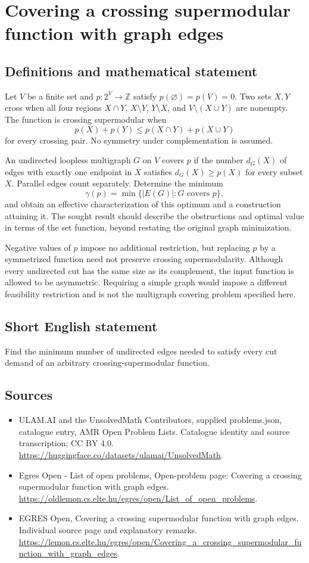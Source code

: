 \documentclass[11pt,a4paper]{article}
\begin{document}
\section*{Covering a crossing supermodular function with graph edges}\label{statement}

\subsection{Definitions and mathematical statement}
Let $V$ be a finite set and $p:2^V\to\mathbb Z$ satisfy
$p(\varnothing)=p(V)=0$. Two sets $X,Y$ cross when all four regions
$X\cap Y$, $X\setminus Y$, $Y\setminus X$, and $V\setminus(X\cup Y)$
are nonempty. The function is crossing supermodular when
\[
                     p(X)+p(Y)\le p(X\cap Y)+p(X\cup Y)
\]
for every crossing pair. No symmetry under complementation is assumed.

An undirected loopless multigraph $G$ on $V$ covers $p$ if the number
$d_G(X)$ of edges with exactly one endpoint in $X$ satisfies
$d_G(X)\ge p(X)$ for every subset $X$. Parallel edges count separately.
Determine the minimum
\[
             \gamma(p)=\min\{|E(G)|:G\text{ covers }p\},
\]
and obtain an effective characterization of this optimum and a
construction attaining it. The sought result should describe the
obstructions and optimal value in terms of the set function, beyond
restating the original graph minimization.

Negative values of $p$ impose no additional restriction, but replacing
$p$ by a symmetrized function need not preserve crossing supermodularity.
Although every undirected cut has the same size as its complement,
the input function is allowed to be asymmetric. Requiring a simple
graph would impose a different feasibility restriction and is not
the multigraph covering problem specified here.
\subsection{Short English statement}
Find the minimum number of undirected edges needed to satisfy
every cut demand of an arbitrary crossing-supermodular function.
\subsection{Sources}
\begin{itemize}
\item[S1] ULAM.AI and the UnsolvedMath Contributors, supplied problems.json, catalogue entry, AMR Open Problem Lists. Catalogue identity and source transcription; CC BY 4.0.
\url{https://huggingface.co/datasets/ulamai/UnsolvedMath}.
\item[S2] Egres Open - List of open problems, Open-problem page: Covering a crossing supermodular function with graph edges. 
\url{https://oldlemon.cs.elte.hu/egres/open/List_of_open_problems}.
\item[S3] EGRES Open, Covering a crossing supermodular function with graph edges. Individual source page and explanatory remarks.
\url{https://lemon.cs.elte.hu/egres/open/Covering_a_crossing_supermodular_function_with_graph_edges}.
\end{itemize}
\end{document}
